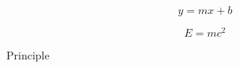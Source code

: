 \lipsum[2]

\begin{equation}
    y=mx+b
\end{equation}

\begin{equation}
    E=mc^2
\end{equation}

\lipsum[1-2]

\begin{principle}{Principle}
    \lipsum[8]
\end{principle}

\lipsum[9]

\begin{example}
    \lipsum[2]
\end{example}

\lipsum[10-11]
